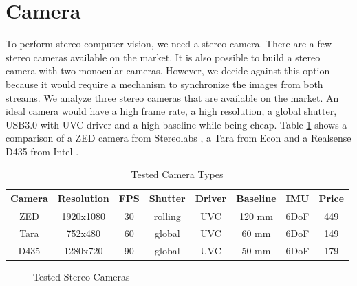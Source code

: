 \documentclass[11pt,a4paper,titlepage,oneside]{report}
\begin{document}
\section{Camera}

To perform stereo computer vision, we need a stereo camera. There are a few stereo cameras available on the market. It is also possible to build a stereo camera with two monocular cameras. However, we decide against this option because it would require a mechanism to synchronize the images from both streams. We analyze three stereo cameras that are available on the market. An ideal camera would have a high frame rate, a high resolution, a global shutter, USB3.0 with UVC driver and a high baseline while being cheap. Table \ref{tab:cameras} shows a comparison of a ZED camera from Stereolabs \cite{zed}, a Tara from Econ \cite{tara} and a Realsense D435 from Intel \cite{realsense}.

\tiny
\begin{table}[H]
  \centering
  \begin{tabular}{|c|c|c|c|c|c|c|c|}
  Camera & Resolution & FPS & Shutter & Driver & Baseline & IMU & Price \\
  \hline
  ZED & 1920x1080 & 30 & rolling &  UVC & 120 mm & 6DoF & 449\\
  Tara & 752x480& 60 & global &  UVC &  60 mm & 6DoF & 149\\
  D435 & 1280x720& 90 & global & UVC &  50 mm & 6DoF & 179\\
\end{tabular}
\caption{Tested Camera Types}
\label{tab:cameras}
\end{table}
\normalsize

\begin{figure}[H]
  \centering
  \quad
  \quad
  \caption{Tested Stereo Cameras}\label{fig:cameras}
\end{figure}
\end{document}
